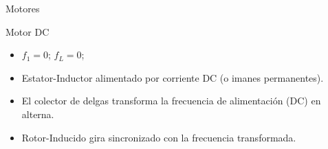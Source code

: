 \documentclass[xcolor={usenames,svgnames,dvipsnames}]{beamer}
\begin{document}
\begin{frame}[label={sec:orga82357b}]{Motores}
\begin{block}{Motor DC}
\begin{itemize}
\item \(f_{1}=0\); \(f_{L}=0\);

\item Estator-Inductor alimentado por corriente DC (o imanes permanentes).

\item El colector de delgas transforma la frecuencia de alimentación (DC)
en alterna.

\item Rotor-Inducido gira sincronizado con la frecuencia \guillemotleft{}transformada\guillemotright{}.
\end{itemize}
\end{block}
\end{frame}
\end{document}
